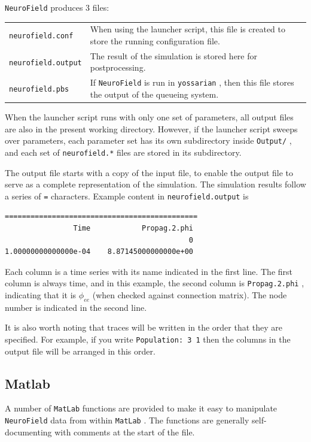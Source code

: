 \documentclass[12pt,a4paper]{article}
\newcommand{\type}[1]{ {\small\small\tt #1} }
\newcommand{\NF}[0]{ \type{NeuroField}}
\begin{document}
\NF produces 3 files:

\begin{tabular}{l p{14.4cm}}
\type{neurofield.conf}& When using the launcher script, this file is created to store the running configuration file.\\
\type{neurofield.output}& The result of the simulation is stored here for postprocessing.\\
\type{neurofield.pbs}& If \NF is run in \type{yossarian}, then this file stores the output of the queueing system.
\end{tabular}

When the launcher script runs with only one set of parameters, all output files are also in the present working directory. However, if the launcher script sweeps over parameters, each parameter set has its own subdirectory inside \type{Output/}, and each set of \type{neurofield.*} files are stored in its subdirectory.

The output file starts with a copy of the input file, to enable the output file to serve as a complete representation of the simulation. The simulation results follow a series of \type{=} characters. Example content in \type{neurofield.output} is
\begin{lstlisting}
=============================================
                Time            Propag.2.phi
                                           0
1.00000000000000e-04    8.87145000000000e+00
\end{lstlisting}

Each column is a time series with its name indicated in the first line. The first column is always time, and in this example, the second column is \type{Propag.2.phi}, indicating that it is $\phi_{ee}$ (when checked against connection matrix). The node number is indicated in the second line.

It is also worth noting that traces will be written in the order that they are specified. For example, if you write \type{Population: 3 1} then the columns in the output file will be arranged in this order. 

\subsection{Matlab}
A number of \type{MatLab} functions are provided to make it easy to manipulate \NF data from within \type{MatLab}. The functions are generally self-documenting with comments at the start of the file.
\end{document}
